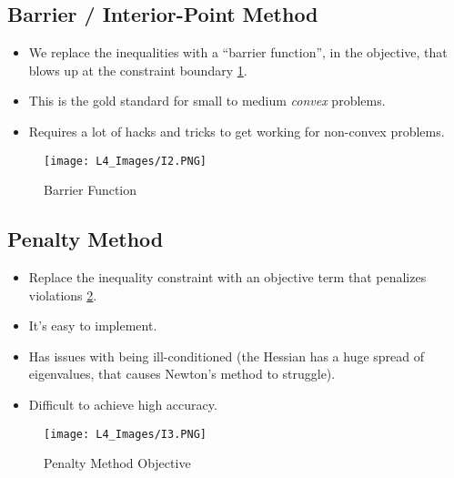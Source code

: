 \subsection{Barrier / Interior-Point Method}
\begin{itemize}
    \item We replace the inequalities with a ``barrier function'', in the objective, that blows up at the constraint boundary \cref{fig:l4f2}.
    \item This is the gold standard for small to medium \textit{convex} problems.
    \item Requires a lot of hacks and tricks to get working for non-convex problems.
\end{itemize}
\begin{figure}
    \centering
    \texttt{[image: L4\_Images/I2.PNG]}
    \caption{Barrier Function}
    \label{fig:l4f2}
\end{figure}

\subsection{Penalty Method}
\begin{itemize}
    \item Replace the inequality constraint with an objective term that penalizes violations \cref{fig:l4f3}.
    \item It's easy to implement. 
    \item Has issues with being ill-conditioned (the Hessian has a huge spread of eigenvalues, that causes Newton's method to struggle). 
    \item Difficult to achieve high accuracy.
\end{itemize}
\begin{figure}
    \centering
    \texttt{[image: L4\_Images/I3.PNG]}
    \caption{Penalty Method Objective}
    \label{fig:l4f3}
\end{figure}

